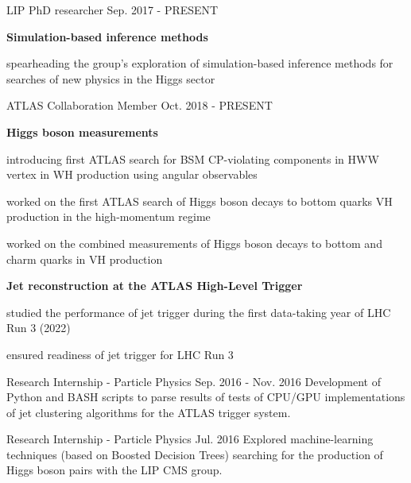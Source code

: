 
\begin{cventries}

    \cventry
    {LIP}
    {PhD researcher}
    {}
    {Sep. 2017 - PRESENT}
    {
        \textbf{Simulation-based inference methods}\vspace{12pt}
        \begin{cvitems}            
            \item {spearheading the group's exploration of simulation-based inference methods for searches of new physics in the Higgs sector}
        \end{cvitems}
    }

    \cventry
    {ATLAS Collaboration}
    {Member}
    {}
    {Oct. 2018 - PRESENT}
    {
        \textbf{Higgs boson measurements}\vspace{14pt}
        \begin{cvitems}
            \item {introducing first ATLAS search for BSM CP-violating components in HWW vertex in WH production using angular observables}
            \item {worked on the first ATLAS search of Higgs boson decays to bottom quarks VH production in the high-momentum regime}
            \item {worked on the combined measurements of Higgs boson decays to bottom and charm quarks in VH production}
        \end{cvitems}\vspace{19pt}
        \textbf{Jet reconstruction at the ATLAS High-Level Trigger}\vspace{14pt}
        \begin{cvitems}
            \item {studied the performance of jet trigger during the first data-taking year of LHC Run 3 (2022)}
            \item {ensured readiness of jet trigger for LHC Run 3}
        \end{cvitems}
    }

    {Research Internship - Particle Physics}
    {}
    {Sep. 2016 - Nov. 2016}
    {Development of Python and BASH scripts to parse results of tests of CPU/GPU implementations of jet clustering algorithms for the ATLAS trigger system.}

    {Research Internship - Particle Physics}
    {}
    {Jul. 2016}
    {Explored machine-learning techniques (based on Boosted Decision Trees) searching for the production of Higgs boson pairs with the LIP CMS group.}


\end{cventries}